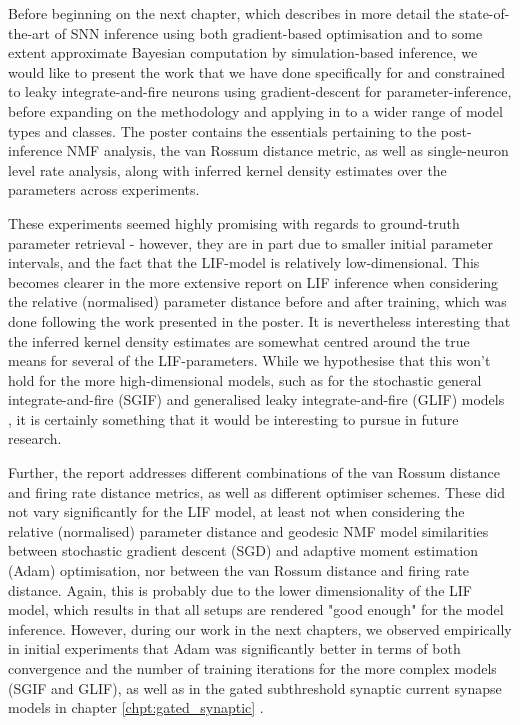 \documentclass[mphil,deptreport,ianc]{infthesis} %
\begin{document}
Before beginning on the next chapter, which describes in more detail the state-of-the-art of SNN inference using both gradient-based optimisation and to some extent approximate Bayesian computation by simulation-based inference, we would like to present the work that we have done specifically for and constrained to leaky integrate-and-fire neurons using gradient-descent for parameter-inference, before expanding on the methodology and applying in to a wider range of model types and classes.
The poster contains the essentials pertaining to the post-inference NMF analysis, the van Rossum distance metric, as well as single-neuron level rate analysis, along with inferred kernel density estimates over the parameters across experiments.

These experiments seemed highly promising with regards to ground-truth parameter retrieval - however, they are in part due to smaller initial parameter intervals, and the fact that the LIF-model is relatively low-dimensional.
This becomes clearer in the more extensive report on LIF inference when considering the relative (normalised) parameter distance before and after training, which was done following the work presented in the poster.
It is nevertheless interesting that the inferred kernel density estimates are somewhat centred around the true means for several of the LIF-parameters.
While we hypothesise that this won't hold for the more high-dimensional models, such as for the stochastic general integrate-and-fire (SGIF) \cite{Rene2020} and generalised leaky integrate-and-fire (GLIF) models \cite{allen_glif_white_paper}, it is certainly something that it would be interesting to pursue in future research.

Further, the report addresses different combinations of the van Rossum distance and firing rate distance metrics, as well as different optimiser schemes.
These did not vary significantly for the LIF model, at least not when considering the relative (normalised) parameter distance and geodesic NMF model similarities between stochastic gradient descent (SGD) and adaptive moment estimation (Adam) optimisation, nor between the van Rossum distance and firing rate distance.
Again, this is probably due to the lower dimensionality of the LIF model, which results in that all setups are rendered "good enough" for the model inference.
However, during our work in the next chapters, we observed empirically in initial experiments that Adam was significantly better in terms of both convergence and the number of training iterations for the more complex models (SGIF and GLIF), as well as in the gated subthreshold synaptic current synapse models in chapter \ref{chpt:gated_synaptic} \cite{Huh2017}.
\end{document}
